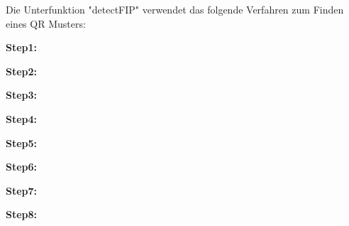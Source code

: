 Die Unterfunktion "detectFIP" verwendet das folgende Verfahren zum Finden eines QR Musters:

\textbf{Step1:}



\singlespacing
\begin{matlab}[firstnumber=1, name=MATLABCodeBeispiel, caption={MATLAB Code Beispiel}, label={lst:MATLABCodeBeispiel}]

\end{matlab}
\onehalfspacing

\textbf{Step2:}


\textbf{Step3:}


\textbf{Step4:}


\textbf{Step5:}


\textbf{Step6:}



\textbf{Step7:}


\textbf{Step8:}